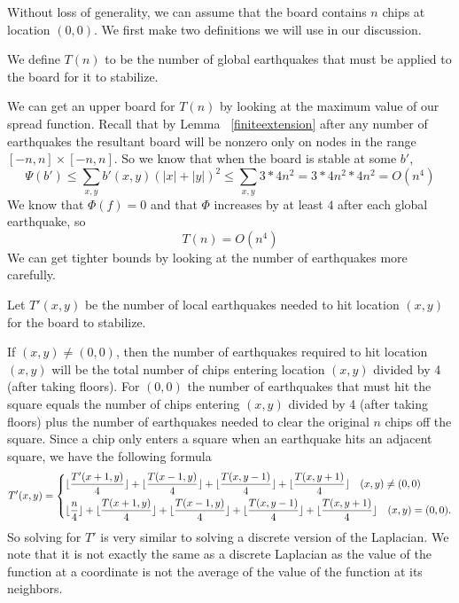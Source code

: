\documentclass[runningheads,a4paper]{llncs}
\begin{document}
Without loss of generality, we can assume that the board contains $n$ chips at location $(0,0)$. We first make two definitions we will use in our discussion.
\begin{definition}
We define $T(n)$ to be the number of global earthquakes that must be applied to the board for it to stabilize.
\end{definition}

We can get an upper board for $T(n)$ by looking at the maximum value of our spread function.
Recall that by Lemma ~\ref{finiteextension} after any number of earthquakes the resultant board will be nonzero only on nodes in the range $[-n, n] \times [-n, n]$. 
So we know that when the board is stable at some $b'$, 
\begin{equation*}
\Psi(b') \leq \sum_{x,y} b'(x,y)(|x| + |y|)^2 \leq \sum_{x,y} 3*4n^2 = 3*4n^2*4n^2= O(n^4)
\end{equation*}
We know that $\Phi(f) = 0$ and that $\Phi$ increases by at least $4$ after each global earthquake, so
\begin{equation*}
T(n) = O(n^4)
\end{equation*}
We can get tighter bounds by looking at the number of earthquakes more carefully.

\begin{definition}
 Let $T'(x,y)$ be the number of local earthquakes needed to hit location $(x,y)$ for the board to stabilize. 
 \end{definition} 
 If $(x,y) \neq (0,0)$, then the number of earthquakes required to hit location $(x,y)$ will be the total number of chips entering location $(x,y)$ divided by 4 (after taking floors). For $(0,0)$ the number of earthquakes that must hit the square equals the number of chips entering $(x,y)$ divided by 4 (after taking floors) plus the number of earthquakes needed to clear the original $n$ chips off the square.
 Since a chip only enters a square when an earthquake hits an adjacent square, we have the following formula
\begin{equation*}
T'(x,y) = \begin{dcases} \lfloor\frac{T'(x+1, y)}{4} \rfloor + \lfloor \frac{T(x-1, y)}{4} \rfloor + \lfloor \frac{T(x, y-1)}{4} \rfloor + \lfloor \frac{T(x, y+1)}{4} \rfloor  \quad (x,y) \neq (0,0) \\
 \lfloor \frac{n}{4} \rfloor  + \lfloor\frac{T(x+1, y)}{4} \rfloor + \lfloor \frac{T(x-1, y)}{4} \rfloor + \lfloor \frac{T(x, y-1)}{4} \rfloor + \lfloor \frac{T(x, y+1)}{4} \rfloor  \quad (x,y) = (0,0) .
 \end{dcases}
 \end{equation*}
So solving for $T'$ is very similar to solving a discrete version of the Laplacian. We note that it is not exactly the same as a discrete Laplacian as the value of the function at a coordinate is not the average of the value of the function at its neighbors.
\end{document}

